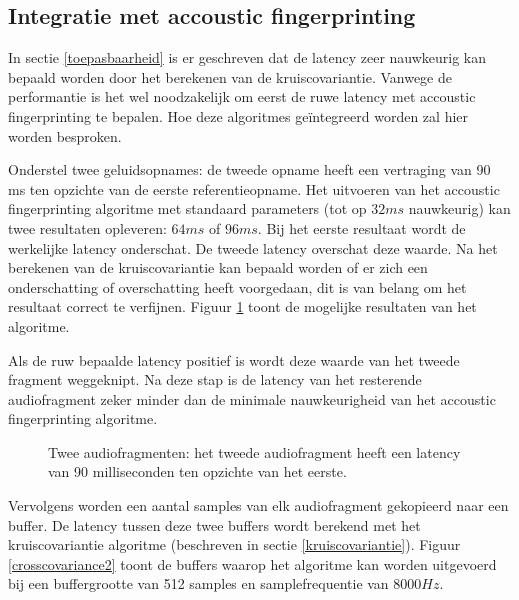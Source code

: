 \subsection{Integratie met accoustic fingerprinting}
\label{integratie-accoustic-fingerprinting}

In sectie \ref{toepasbaarheid} is er geschreven dat de latency zeer nauwkeurig kan bepaald worden door het berekenen van de kruiscovariantie. Vanwege de performantie is het wel noodzakelijk om eerst de ruwe latency met accoustic fingerprinting te bepalen. Hoe deze algoritmes geïntegreerd worden zal hier worden besproken. 

Onderstel twee geluidsopnames: de tweede opname heeft een vertraging van 90 ms ten opzichte van de eerste referentieopname. Het uitvoeren van het accoustic fingerprinting algoritme met standaard parameters (tot op $ 32 ms $ nauwkeurig) kan twee resultaten opleveren: $ 64 ms $ of $ 96 ms $. Bij het eerste resultaat wordt de werkelijke latency onderschat. De tweede latency overschat deze waarde. Na het berekenen van de kruiscovariantie kan bepaald worden of er zich een onderschatting of overschatting heeft voorgedaan, dit is van belang om het resultaat correct te verfijnen. Figuur \ref{crosscovariance1} toont de mogelijke resultaten van het algoritme.

Als de ruw bepaalde latency positief is wordt deze waarde van het tweede fragment weggeknipt. Na deze stap is de latency van het resterende audiofragment zeker minder dan de minimale nauwkeurigheid van het accoustic fingerprinting algoritme. 

\begin{figure}[h!]
	\captionsetup{width=0.7\textwidth}
	\caption[Kruiscovariantie audiofragmenten]{Twee audiofragmenten: het tweede audiofragment heeft een latency van 90 milliseconden ten opzichte van het eerste.}
	\begin{center}
		\advance\parskip0.3cm
		
	\end{center}
	\label{crosscovariance1}
\end{figure}


Vervolgens worden een aantal samples van elk audiofragment gekopieerd naar een buffer. De latency tussen deze twee buffers wordt berekend met het kruiscovariantie algoritme (beschreven in sectie \ref{kruiscovariantie}). Figuur \ref{crosscovariance2} toont de buffers waarop het algoritme kan worden uitgevoerd bij een buffergrootte van 512 samples en samplefrequentie van $ 8000Hz $.

